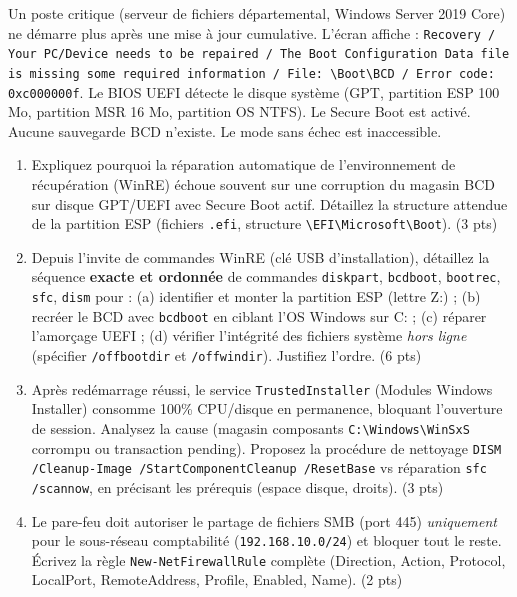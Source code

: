 \documentclass[11pt]{article}
\begin{document}
\begin{exercice}
Un poste critique (serveur de fichiers départemental, Windows Server 2019 Core) ne démarre plus après une mise à jour cumulative. L'écran affiche : \texttt{Recovery / Your PC/Device needs to be repaired / The Boot Configuration Data file is missing some required information / File: \textbackslash Boot\textbackslash BCD / Error code: 0xc000000f}. Le BIOS UEFI détecte le disque système (GPT, partition ESP 100 Mo, partition MSR 16 Mo, partition OS NTFS). Le Secure Boot est activé. Aucune sauvegarde BCD n'existe. Le mode sans échec est inaccessible.

\begin{enumerate}
    \item Expliquez pourquoi la réparation automatique de l'environnement de récupération (WinRE) échoue souvent sur une corruption du magasin BCD sur disque GPT/UEFI avec Secure Boot actif. Détaillez la structure attendue de la partition ESP (fichiers \texttt{.efi}, structure \texttt{\textbackslash EFI\textbackslash Microsoft\textbackslash Boot}). (3 pts)
    \item Depuis l'invite de commandes WinRE (clé USB d'installation), détaillez la séquence \textbf{exacte et ordonnée} de commandes \texttt{diskpart}, \texttt{bcdboot}, \texttt{bootrec}, \texttt{sfc}, \texttt{dism} pour : (a) identifier et monter la partition ESP (lettre Z:) ; (b) recréer le BCD avec \texttt{bcdboot} en ciblant l'OS Windows sur C: ; (c) réparer l'amorçage UEFI ; (d) vérifier l'intégrité des fichiers système \textit{hors ligne} (spécifier \texttt{/offbootdir} et \texttt{/offwindir}). Justifiez l'ordre. (6 pts)
    \item Après redémarrage réussi, le service \texttt{TrustedInstaller} (Modules Windows Installer) consomme 100\% CPU/disque en permanence, bloquant l'ouverture de session. Analysez la cause (magasin composants \texttt{C:\textbackslash Windows\textbackslash WinSxS} corrompu ou transaction pending). Proposez la procédure de nettoyage \texttt{DISM /Cleanup-Image /StartComponentCleanup /ResetBase} vs réparation \texttt{sfc /scannow}, en précisant les prérequis (espace disque, droits). (3 pts)
    \item Le pare-feu doit autoriser le partage de fichiers SMB (port 445) \textit{uniquement} pour le sous-réseau comptabilité (\texttt{192.168.10.0/24}) et bloquer tout le reste. Écrivez la règle \texttt{New-NetFirewallRule} complète (Direction, Action, Protocol, LocalPort, RemoteAddress, Profile, Enabled, Name). (2 pts)
\end{enumerate}
\end{exercice}
\end{document}
